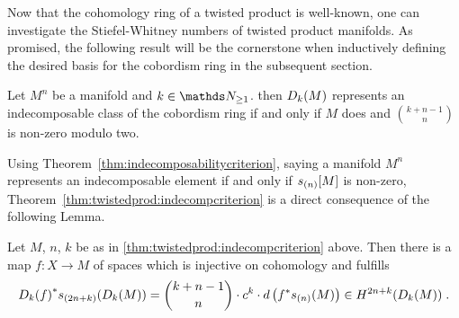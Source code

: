 Now that the cohomology ring of a twisted product is well-known, one
can investigate the Stiefel-Whitney numbers of twisted product manifolds.
As promised, the following result will be the cornerstone when inductively
defining the desired basis for the cobordism ring in the subsequent section.
\begin{Thm}\label{thm:twistedprod:indecompcriterion}
  Let $M^n$ be a manifold and $k\in\Nat_{\geq1}$.
  then $D_{k}({M})$ represents an indecomposable class of the
  cobordism ring if and only if $M$ does and $\binom{k+n-1}{n}$ is
  non-zero modulo two.
\end{Thm}
Using Theorem~\autoref{thm:indecomposabilitycriterion}, saying
a manifold $M^n$ represents an indecomposable element if and only if
$s_{(n)}[M]$ is non-zero,
Theorem~\autoref{thm:twistedprod:indecompcriterion} is a direct
consequence of the following Lemma.
\begin{Lem}\label{lem:twistedprod:indecompcriterion}
  Let $M$, $n$, $k$ be as in
  \autoref{thm:twistedprod:indecompcriterion} above.
  Then there is a map $f\colon X\to M$ of spaces which is injective on
  cohomology and fulfills
  \begin{gather*}
    {D_{k}({f})}^* s_{(2n+k)}(D_{k}({M}))
    = \binom{k+n-1}{n} \cdot c^k
    \cdot d\left( {f}^* s_{(n)}(M) \right)
    \in H^{2n+k}(D_{k}({M}))
    \;.
  \end{gather*}
\end{Lem}
